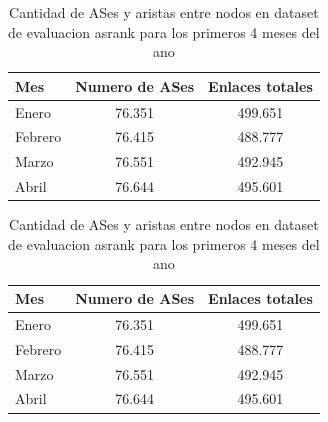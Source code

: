 \begin{table}[H]
\centering
\caption{Cantidad de ASes y aristas entre nodos en dataset de evaluacion asrank para los primeros 4 meses del ano}
\begin{tabular}{lcc}
\toprule
\textbf{Mes} & \textbf{Numero de ASes } & \textbf{Enlaces totales} \\
\midrule
Enero   &  76.351 & 499.651 \\
Febrero &  76.415 & 488.777 \\
Marzo   &  76.551 & 492.945 \\
Abril   &  76.644 & 495.601 \\
\end{tabular}
\label{tab:asrank_datasets_anexo_repetido}
\end{table}



\begin{table}[H]
\centering
\caption{Cantidad de ASes y aristas entre nodos en dataset de evaluacion asrank para los primeros 4 meses del ano}
\begin{tabular}{lcc}
\toprule
\textbf{Mes} & \textbf{Numero de ASes } & \textbf{Enlaces totales} \\
\midrule
Enero   &  76.351 & 499.651 \\
Febrero &  76.415 & 488.777 \\
Marzo   &  76.551 & 492.945 \\
Abril   &  76.644 & 495.601 \\
\end{tabular}
\label{tab:asrank_datasets}
\end{table}







